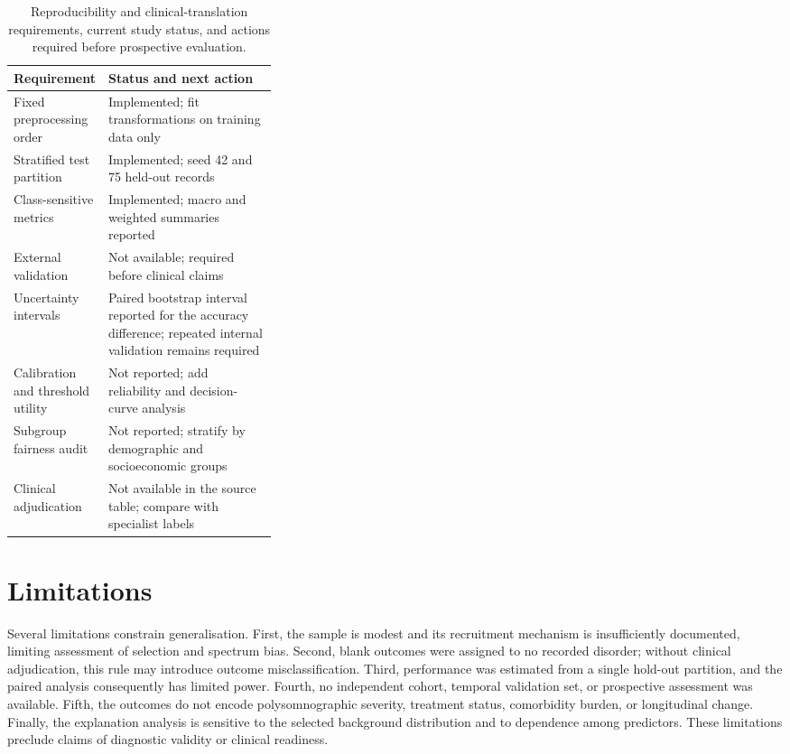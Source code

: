 ﻿\documentclass[preprint,12pt]{elsarticle}
\begin{document}
\begin{table}[H]
\centering
\caption{Reproducibility and clinical-translation requirements, current study status, and actions required before prospective evaluation.}
\label{tab:checklist}
\footnotesize
\renewcommand{\arraystretch}{1.12}
\begin{tabularx}{\linewidth}{@{}p{0.34\linewidth}X@{}}
\toprule
Requirement & Status and next action \\
\midrule
Fixed preprocessing order & Implemented; fit transformations on training data only \\
Stratified test partition & Implemented; seed 42 and 75 held-out records \\
Class-sensitive metrics & Implemented; macro and weighted summaries reported \\
External validation & Not available; required before clinical claims \\
Uncertainty intervals & Paired bootstrap interval reported for the accuracy difference; repeated internal validation remains required \\
Calibration and threshold utility & Not reported; add reliability and decision-curve analysis \\
Subgroup fairness audit & Not reported; stratify by demographic and socioeconomic groups \\
Clinical adjudication & Not available in the source table; compare with specialist labels \\
\bottomrule
\end{tabularx}
\end{table}

\section{Limitations}
Several limitations constrain generalisation. First, the sample is modest and its recruitment mechanism is insufficiently documented, limiting assessment of selection and spectrum bias. Second, blank outcomes were assigned to no recorded disorder; without clinical adjudication, this rule may introduce outcome misclassification. Third, performance was estimated from a single hold-out partition, and the paired analysis consequently has limited power. Fourth, no independent cohort, temporal validation set, or prospective assessment was available. Fifth, the outcomes do not encode polysomnographic severity, treatment status, comorbidity burden, or longitudinal change. Finally, the explanation analysis is sensitive to the selected background distribution and to dependence among predictors. These limitations preclude claims of diagnostic validity or clinical readiness.
\end{document}

